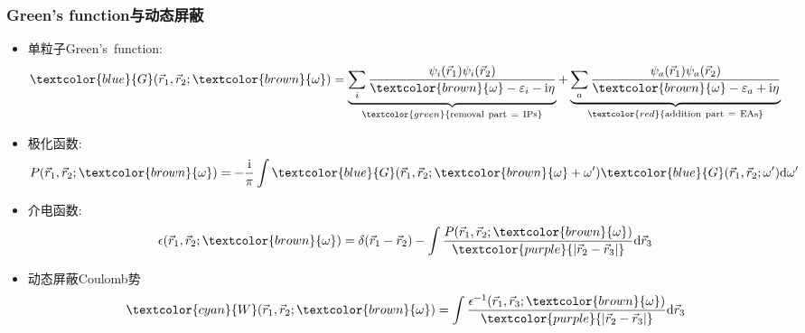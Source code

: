 {\frame
{
	\frametitle{\textrm{Green's function}与动态屏蔽}
	\vspace*{-15pt}
	\begin{itemize}
		\item 单粒子\textrm{Green's~function}:
	\begin{displaymath}
		\textcolor{blue}{G}(\vec r_1,\vec r_2;\textcolor{brown}{\omega})=\underbrace{\sum_i\dfrac{\psi_i(\vec r_1)\psi_i(\vec r_2)}{\textcolor{brown}{\omega}-\varepsilon_i-\mathrm{i}\eta}}_{\textcolor{green}{\mathrm{removal~part~=~IPs}}}+\underbrace{\sum_a\dfrac{\psi_a(\vec r_1)\psi_a(\vec r_2)}{\textcolor{brown}{\omega}-\varepsilon_a+\mathrm{i}\eta}}_{\textcolor{red}{\mathrm{addition~part~=~EAs}}}
	\end{displaymath}
\item 极化函数:
	\begin{displaymath}
		P(\vec r_1,\vec r_2;\textcolor{brown}{\omega})=-\dfrac{\mathrm{i}}{\pi}\int\textcolor{blue}{G}(\vec r_1,\vec r_2;\textcolor{brown}{\omega}+\omega^{\prime})\textcolor{blue}{G}(\vec r_1,\vec r_2;\omega^{\prime})\mathrm{d}\omega^{\prime}
	\end{displaymath}
\item 介电函数:
	\begin{displaymath}
		\epsilon(\vec r_1,\vec r_2;\textcolor{brown}{\omega})=\delta(\vec r_1-\vec r_2)-\int\dfrac{P(\vec r_1,\vec r_2;\textcolor{brown}{\omega})}{\textcolor{purple}{|\vec r_2-\vec r_3|}}\mathrm{d}\vec r_3
	\end{displaymath}
\item 动态屏蔽\textrm{Coulomb}势
	\begin{displaymath}
		\textcolor{cyan}{W}(\vec r_1,\vec r_2;\textcolor{brown}{\omega})=\int\dfrac{\epsilon^{-1}(\vec r_1,\vec r_3;\textcolor{brown}{\omega})}{\textcolor{purple}{|\vec r_2-\vec r_3|}}\mathrm{d}\vec r_3
	\end{displaymath}
	\end{itemize}
}

}
